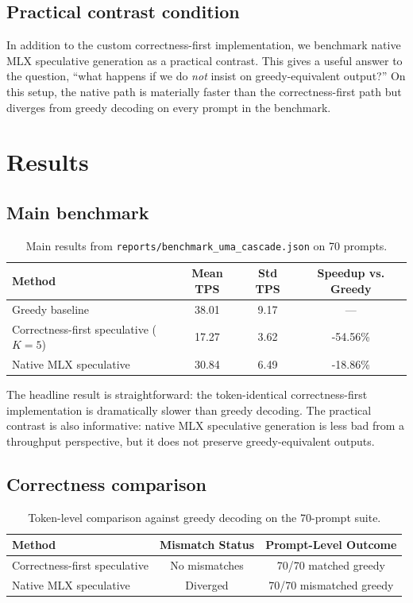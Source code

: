 \documentclass[11pt]{article}
\begin{document}
\subsection{Practical contrast condition}
In addition to the custom correctness-first implementation, we benchmark native MLX speculative generation as a practical contrast. This gives a useful answer to the question, ``what happens if we do \emph{not} insist on greedy-equivalent output?'' On this setup, the native path is materially faster than the correctness-first path but diverges from greedy decoding on every prompt in the benchmark.

\section{Results}

\subsection{Main benchmark}

\begin{table}[h]
\centering
\begin{tabular}{@{}lccc@{}}
\toprule
\textbf{Method} & \textbf{Mean TPS} & \textbf{Std TPS} & \textbf{Speedup vs. Greedy} \\
\midrule
Greedy baseline & 38.01 & 9.17 & --- \\
Correctness-first speculative ($K=5$) & 17.27 & 3.62 & -54.56\% \\
Native MLX speculative & 30.84 & 6.49 & -18.86\% \\
\bottomrule
\end{tabular}
\caption{Main results from \texttt{reports/benchmark\_uma\_cascade.json} on 70 prompts.}
\label{tab:main}
\end{table}

The headline result is straightforward: the token-identical correctness-first implementation is dramatically slower than greedy decoding. The practical contrast is also informative: native MLX speculative generation is less bad from a throughput perspective, but it does not preserve greedy-equivalent outputs.

\subsection{Correctness comparison}

\begin{table}[h]
\centering
\begin{tabular}{@{}lcc@{}}
\toprule
\textbf{Method} & \textbf{Mismatch Status} & \textbf{Prompt-Level Outcome} \\
\midrule
Correctness-first speculative & No mismatches & 70/70 matched greedy \\
Native MLX speculative & Diverged & 70/70 mismatched greedy \\
\bottomrule
\end{tabular}
\caption{Token-level comparison against greedy decoding on the 70-prompt suite.}
\label{tab:correctness}
\end{table}
\end{document}
